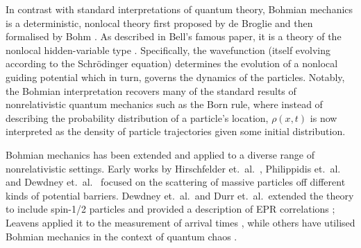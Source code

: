 \documentclass[
prx
,twocolumn
,nofootinbib
,floatfix
,superscriptaddress
]{revtex4-2}
\begin{document}
In contrast with standard interpretations of quantum theory, Bohmian mechanics is a deterministic, nonlocal theory first proposed by de Broglie \cite{debroglie:jpa-00205292} and then formalised by Bohm \cite{bohmPhysRev.85.166,bohm2006undivided}. As described in Bell's famous paper, it is a theory of the nonlocal hidden-variable type \cite{EPRPhysRev.47.777,bellPhysicsPhysiqueFizika.1.195}. Specifically, the wavefunction (itself evolving according to the Schr\"odinger equation) determines the evolution of a nonlocal guiding potential which in turn, governs the dynamics of the particles. Notably, the Bohmian interpretation recovers many of the standard results of nonrelativistic quantum mechanics such as the Born rule, where instead of describing the probability distribution of a particle's location, $\rho(x,t)$ is now interpreted as the density of particle trajectories given some initial distribution.

Bohmian mechanics has been extended and applied to a diverse range of nonrelativistic settings. Early works by Hirschfelder et.\ al.\ \cite{hirschfelderdoi:10.1063/1.1681899}, Philippidis et.\ al.\ \cite{philippidis1979quantum} and Dewdney et.\ al.\ \cite{dewdney1982quantum} focused on the scattering of massive particles off different kinds of potential barriers. Dewdney et.\ al.\ and Durr et.\ al.\ extended the theory to include spin-1/2 particles and provided a description of EPR correlations \cite{dewdney1988spin,durr1996bohmian}; Leavens applied it to the measurement of arrival times \cite{leavensPhysRevA.58.840}, while others have utilised Bohmian mechanics in the context of quantum chaos \cite{durr1992quantum,FRISK1997139}. 
\end{document}
